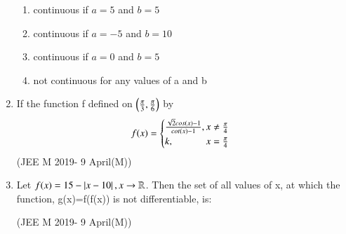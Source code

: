 \documentclass[journal,12pt,twocolumn]{IEEEtran}
\theoremstyle{remark}
\begin{document}
\begin{enumerate}[start=36]
	\begin{enumerate}[label=(\alph*)]
		\item continuous if $a=5$ and $b=5$
		\item continuous if $a=-5$ and $b=10$
		\item continuous if $a=0$ and $b=5$
		\item not continuous for any values of a and b
	\end{enumerate}
\item If the function f defined on $ \left( \frac{\pi}{3}, \frac{\pi}{6}\right)$ by
	\begin{equation}
	    f(x)= 
	    \begin{cases}
		    \frac{\sqrt{2} cos(x)-1}{cot(x)-1}, \hfill{x \ne \frac{\pi}{4}}\\
		    k, \hfill{x = \frac{\pi}{4}}\\
	    \end{cases}
	\end{equation}
	\hfill{(JEE M 2019- 9 April(M))}
	\begin{enumerate}[label=(\alph*)]
	\end{enumerate}
\item Let $f(x)= 15-\left\vert x-10\right\vert, x\to\mathbb{R}$. Then the set of all values of x, at which the function, g(x)=f(f(x)) is not differentiable, is:

	\hfill{(JEE M 2019- 9 April(M))}
	\begin{enumerate}[label=(\alph*)]
	\end{enumerate}
\end{enumerate}
\end{document}
